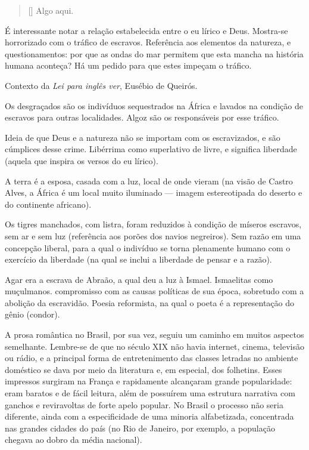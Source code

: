 \documentclass[12pt]{book}
\begin{document}
				\settowidth{\versewidth}{Algo aqui.}
				\begin{verse}[\versewidth]
					Algo aqui.
				\end{verse}
				\par É interessante notar a relação estabelecida entre o eu lírico e Deus. Mostra-se horrorizado com o tráfico de escravos. Referência aos elementos da natureza, e questionamentos: por que as ondas do mar permitem que esta mancha na história humana aconteça? Há um pedido para que estes impeçam o tráfico.
				\par Contexto da \textit{Lei para inglês ver}, Eusébio de Queirós.
				\par Os desgraçados são os indivíduos sequestrados na África e lavados na condição de escravos para outras localidades. Algoz são os responsáveis por esse tráfico.
				\par Ideia de que Deus e a natureza não se importam com os escravizados, e são cúmplices desse crime. Libérrima como superlativo de livre, e significa liberdade (aquela que inspira os versos do eu lírico).
				\par A terra é a esposa, casada com a luz, local de onde vieram (na visão de Castro Alves, a África é um local muito iluminado — imagem estereotipada do deserto e do continente africano).
				\par Os tigres manchados, com listra, foram reduzidos à condição de míseros escravos, sem ar e sem luz (referência aos porões dos navios negreiros). Sem razão em uma concepção liberal, para a qual o indivíduo se torna plenamente humano com o exercício da liberdade (na qual se inclui a liberdade de pensar e a razão).
				\par Agar era a escrava de Abraão, a qual deu a luz à Ismael. Ismaelitas como muçulmanos. compromisso com as causas políticas de sua época, sobretudo com a abolição da escravidão. Poesia reformista, na qual o poeta é a representação do gênio (condor).
		\par A prosa romântica no Brasil, por sua vez, seguiu um caminho em muitos aspectos semelhante. Lembre-se de que no século XIX não havia internet, cinema, televisão ou rádio, e a principal forma de entretenimento das classes letradas no ambiente doméstico se dava por meio da literatura e, em especial, dos folhetins. Esses impressos surgiram na França e rapidamente alcançaram grande popularidade: eram baratos e de fácil leitura, além de possuírem uma estrutura narrativa com ganchos e reviravoltas de forte apelo popular. No Brasil o processo não seria diferente, ainda com a especificidade de uma minoria alfabetizada, concentrada nas grandes cidades do país (no Rio de Janeiro, por exemplo, a população chegava ao dobro da média nacional).
\end{document}
